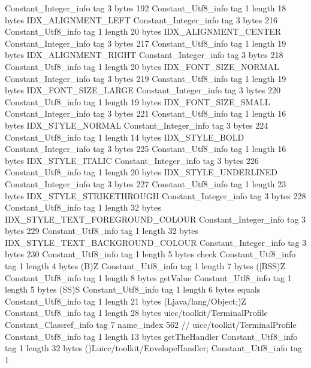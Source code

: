 {{{		}
		Constant_Integer_info {
			tag	3
			bytes	192
		}
		Constant_Utf8_info {
			tag	1
			length	18
			bytes	IDX_ALIGNMENT_LEFT
		}
		Constant_Integer_info {
			tag	3
			bytes	216
		}
		Constant_Utf8_info {
			tag	1
			length	20
			bytes	IDX_ALIGNMENT_CENTER
		}
		Constant_Integer_info {
			tag	3
			bytes	217
		}
		Constant_Utf8_info {
			tag	1
			length	19
			bytes	IDX_ALIGNMENT_RIGHT
		}
		Constant_Integer_info {
			tag	3
			bytes	218
		}
		Constant_Utf8_info {
			tag	1
			length	20
			bytes	IDX_FONT_SIZE_NORMAL
		}
		Constant_Integer_info {
			tag	3
			bytes	219
		}
		Constant_Utf8_info {
			tag	1
			length	19
			bytes	IDX_FONT_SIZE_LARGE
		}
		Constant_Integer_info {
			tag	3
			bytes	220
		}
		Constant_Utf8_info {
			tag	1
			length	19
			bytes	IDX_FONT_SIZE_SMALL
		}
		Constant_Integer_info {
			tag	3
			bytes	221
		}
		Constant_Utf8_info {
			tag	1
			length	16
			bytes	IDX_STYLE_NORMAL
		}
		Constant_Integer_info {
			tag	3
			bytes	224
		}
		Constant_Utf8_info {
			tag	1
			length	14
			bytes	IDX_STYLE_BOLD
		}
		Constant_Integer_info {
			tag	3
			bytes	225
		}
		Constant_Utf8_info {
			tag	1
			length	16
			bytes	IDX_STYLE_ITALIC
		}
		Constant_Integer_info {
			tag	3
			bytes	226
		}
		Constant_Utf8_info {
			tag	1
			length	20
			bytes	IDX_STYLE_UNDERLINED
		}
		Constant_Integer_info {
			tag	3
			bytes	227
		}
		Constant_Utf8_info {
			tag	1
			length	23
			bytes	IDX_STYLE_STRIKETHROUGH
		}
		Constant_Integer_info {
			tag	3
			bytes	228
		}
		Constant_Utf8_info {
			tag	1
			length	32
			bytes	IDX_STYLE_TEXT_FOREGROUND_COLOUR
		}
		Constant_Integer_info {
			tag	3
			bytes	229
		}
		Constant_Utf8_info {
			tag	1
			length	32
			bytes	IDX_STYLE_TEXT_BACKGROUND_COLOUR
		}
		Constant_Integer_info {
			tag	3
			bytes	230
		}
		Constant_Utf8_info {
			tag	1
			length	5
			bytes	check
		}
		Constant_Utf8_info {
			tag	1
			length	4
			bytes	(B)Z
		}
		Constant_Utf8_info {
			tag	1
			length	7
			bytes	([BSS)Z
		}
		Constant_Utf8_info {
			tag	1
			length	8
			bytes	getValue
		}
		Constant_Utf8_info {
			tag	1
			length	5
			bytes	(SS)S
		}
		Constant_Utf8_info {
			tag	1
			length	6
			bytes	equals
		}
		Constant_Utf8_info {
			tag	1
			length	21
			bytes	(Ljava/lang/Object;)Z
		}
		Constant_Utf8_info {
			tag	1
			length	28
			bytes	uicc/toolkit/TerminalProfile
		}
		Constant_Classref_info {
			tag	7
			name_index	562		// uicc/toolkit/TerminalProfile
		}
		Constant_Utf8_info {
			tag	1
			length	13
			bytes	getTheHandler
		}
		Constant_Utf8_info {
			tag	1
			length	32
			bytes	()Luicc/toolkit/EnvelopeHandler;
		}
		Constant_Utf8_info {
			tag	1
}}}
